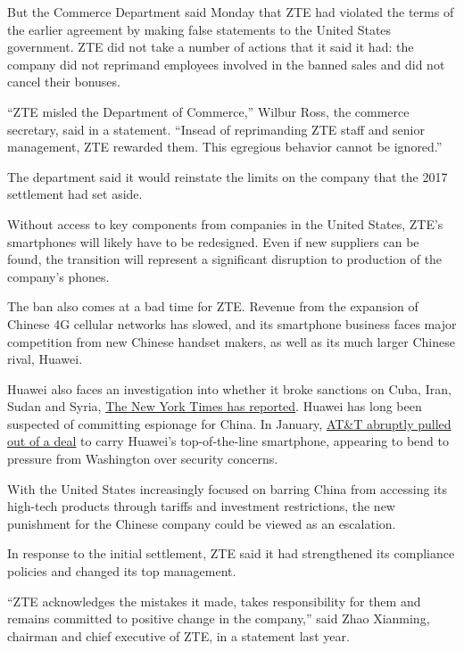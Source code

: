 But the Commerce Department said Monday that ZTE had violated the terms
of the earlier agreement by making false statements to the United States
government. ZTE did not take a number of actions that it said it had:
the company did not reprimand employees involved in the banned sales and
did not cancel their bonuses.

``ZTE misled the Department of Commerce,'' Wilbur Ross, the commerce
secretary, said in a statement. ``Insead of reprimanding ZTE staff and
senior management, ZTE rewarded them. This egregious behavior cannot be
ignored.''

The department said it would reinstate the limits on the company that
the 2017 settlement had set aside.

Without access to key components from companies in the United States,
ZTE's smartphones will likely have to be redesigned. Even if new
suppliers can be found, the transition will represent a significant
disruption to production of the company's phones.

The ban also comes at a bad time for ZTE. Revenue from the expansion of
Chinese 4G cellular networks has slowed, and its smartphone business
faces major competition from new Chinese handset makers, as well as its
much larger Chinese rival, Huawei.

Huawei also faces an investigation into whether it broke sanctions on
Cuba, Iran, Sudan and Syria,
\href{https://www.nytimes.com/2017/04/26/business/huawei-investigation-sanctions-subpoena.html}{The
New York Times has reported}. Huawei has long been suspected of
committing espionage for China. In January,
\href{https://www.nytimes.com/2018/01/24/technology/personaltech/huawei-mate-10-pro-smartphone-review.html}{AT\&T
abruptly pulled out of a deal} to carry Huawei's top-of-the-line
smartphone, appearing to bend to pressure from Washington over security
concerns.

With the United States increasingly focused on barring China from
accessing its high-tech products through tariffs and investment
restrictions, the new punishment for the Chinese company could be viewed
as an escalation.

In response to the initial settlement, ZTE said it had strengthened its
compliance policies and changed its top management.

``ZTE acknowledges the mistakes it made, takes responsibility for them
and remains committed to positive change in the company,'' said Zhao
Xianming, chairman and chief executive of ZTE, in a statement last year.

